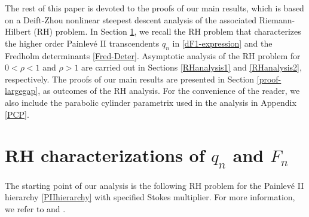 \documentclass[11pt,a4paper]{article}
\numberwithin{equation}{section}
\begin{document}
The rest of this paper is devoted to the proofs of our main results, which is based on a Deift-Zhou nonlinear steepest descent analysis \cite{Deift,DZ1993,DZ1995} of the associated Riemann-Hilbert (RH) problem. In Section \ref{RHproblem}, we recall the RH problem that characterizes the higher order Painlev\'{e} II transcendents $q_n$ in \eqref{dF1-expression} and the Fredholm determinants \eqref{Fred-Deter}. Asymptotic analysis of the RH problem  for $0<\rho<1$ and  $\rho>1$ are carried out in Sections \ref{RHanalysis1} and \ref{RHanalysis2}, respectively. %
The proofs of our main results are presented in Section \ref{proof-largegap}, as outcomes of the RH analysis. For the convenience of the reader, we also include the parabolic cylinder parametrix used in the analysis in Appendix \ref{PCP}.

\section{RH characterizations of $q_n$ and $F_n$}\label{RHproblem}

The starting point of our analysis is the following RH problem for the Painlev\'{e} II hierarchy \eqref{PIIhierarchy} with specified Stokes multiplier. For more information, we refer to \cite{CCG2021} and \cite[Section 4.2]{CIK2010}.
\end{document}
